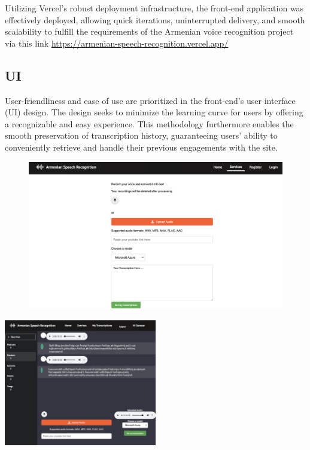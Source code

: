 \documentclass[conference]{IEEEtran}
\begin{document}
Utilizing Vercel's robust deployment infrastructure, the front-end application was effectively deployed, allowing quick iterations, uninterrupted delivery, and smooth scalability to fulfill the requirements of the Armenian voice recognition project via this link \url{https://armenian-speech-recognition.vercel.app/}

\subsection{UI}
User-friendliness and ease of use are prioritized in the front-end's user interface (UI) design. The design seeks to minimize the learning curve for users by offering a recognizable and easy experience. This methodology furthermore enables the smooth preservation of transcription history, guaranteeing users' ability to conveniently retrieve and handle their previous engagements with the site.

\begin{figure}[ht]
\centering
\includegraphics[width=\textwidth]{Services.png}
    \label{fig:ui_design_3}

\end{figure}



\begin{center}
    \includegraphics[width=0.5\textwidth]{RandomChat.png}
    \label{fig:ui_design_2}
\end{center}
\end{document}
